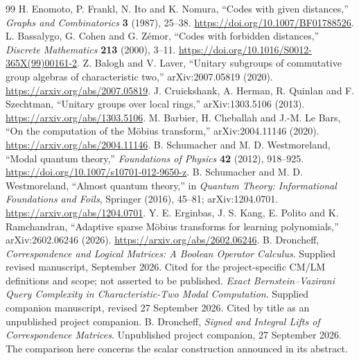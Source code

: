 \documentclass[11pt,a4paper]{article}
\theoremstyle{definition}\newtheorem{definition}[theorem]{Definition}
\theoremstyle{remark}\newtheorem{remark}[theorem]{Remark}
\numberwithin{equation}{section}
\begin{document}
\begin{thebibliography}{99}\small
{} H. Enomoto, P. Frankl, N. Ito and K. Nomura, ``Codes with given distances,'' \emph{Graphs and Combinatorics} \textbf{3} (1987), 25--38. \url{https://doi.org/10.1007/BF01788526}.
 L. Bassalygo, G. Cohen and G. Z\'emor, ``Codes with forbidden distances,'' \emph{Discrete Mathematics} \textbf{213} (2000), 3--11. \url{https://doi.org/10.1016/S0012-365X(99)00161-2}.
 Z. Balogh and V. Laver, ``Unitary subgroups of commutative group algebras of characteristic two,'' arXiv:2007.05819 (2020). \url{https://arxiv.org/abs/2007.05819}.
 J. Cruickshank, A. Herman, R. Quinlan and F. Szechtman, ``Unitary groups over local rings,'' arXiv:1303.5106 (2013). \url{https://arxiv.org/abs/1303.5106}.
 M. Barbier, H. Cheballah and J.-M. Le Bars, ``On the computation of the M\"obius transform,'' arXiv:2004.11146 (2020). \url{https://arxiv.org/abs/2004.11146}.
 B. Schumacher and M. D. Westmoreland, ``Modal quantum theory,'' \emph{Foundations of Physics} \textbf{42} (2012), 918--925. \url{https://doi.org/10.1007/s10701-012-9650-z}.
 B. Schumacher and M. D. Westmoreland, ``Almost quantum theory,'' in \emph{Quantum Theory: Informational Foundations and Foils}, Springer (2016), 45--81; arXiv:1204.0701. \url{https://arxiv.org/abs/1204.0701}.
 Y. E. Erginbas, J. S. Kang, E. Polito and K. Ramchandran, ``Adaptive sparse M\"obius transforms for learning polynomials,'' arXiv:2602.06246 (2026). \url{https://arxiv.org/abs/2602.06246}.
 B. Droncheff, \emph{Correspondence and Logical Matrices: A Boolean Operator Calculus}. Supplied revised manuscript, September 2026. Cited for the project-specific CM/LM definitions and scope; not asserted to be published.
 \emph{Exact Bernstein--Vazirani Query Complexity in Characteristic-Two Modal Computation}. Supplied companion manuscript, revised 27 September 2026. Cited by title as an unpublished project companion.
 B. Droncheff, \emph{Signed and Integral Lifts of Correspondence Matrices}. Unpublished project companion, 27 September 2026. The comparison here concerns the scalar construction announced in its abstract.
\end{thebibliography}
\end{document}
